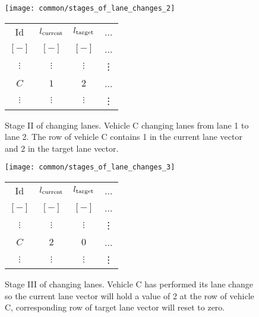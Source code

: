 		\begin{figure}
			\begin{center}
				\begin{minipage}{.65\textwidth}
					\texttt{[image: common/stages\_of\_lane\_changes\_2]}
				\end{minipage}\quad
				\begin{minipage}{.3\textwidth}
					\begin{tabular}{ |c|c|c|c| }
						\hline
						Id &  $l_{\rm current}$ & $l_{\rm target}$ & ... \\
						$[-]$ & $[-]$ & $[-]$ & ...\\
						\hline
						$\vdots$ & $\vdots$ & $\vdots$ & \vdots\\
						$C$ & $1$ & $2$ & ...\\
						$\vdots$ & $\vdots$ & $\vdots$ & \vdots\\
						\hline
					\end{tabular}
				\end{minipage}
			\end{center}
			\caption{Stage II of changing lanes. Vehicle C changing lanes from lane 1 to lane 2. The row of vehicle C contains 1 in the current lane vector and 2 in the target lane vector.}
			\label{fig:stage2ofchanginglanes}
		\end{figure}
		\begin{figure}[ht]
			\begin{center}
				\begin{minipage}{.65\textwidth}
					\texttt{[image: common/stages\_of\_lane\_changes\_3]}
				\end{minipage}\quad
				\begin{minipage}{.3\textwidth}
					\begin{tabular}{ |c|c|c|c| }
						\hline
						Id &  $l_{\rm current}$ & $l_{\rm target}$ & ... \\
						$[-]$ & $[-]$ & $[-]$ & ...\\
						\hline
						$\vdots$ & $\vdots$ & $\vdots$ & \vdots\\
						$C$ & $2$ & $0$ & ...\\
						$\vdots$ & $\vdots$ & $\vdots$ & \vdots\\
						\hline
					\end{tabular}
				\end{minipage}
			\end{center}
			\caption{Stage III of changing lanes. Vehicle C has performed its lane change so the current lane vector will hold a value of 2 at the row of vehicle C, corresponding row of target lane vector will reset to zero.}
			\label{fig:stage3ofchanginglanes}
		\end{figure}
